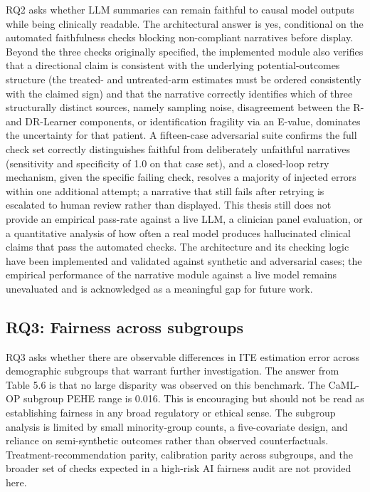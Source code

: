 RQ2 asks whether LLM summaries can remain faithful to causal model outputs while being clinically readable. The architectural answer is yes, conditional on the automated faithfulness checks blocking non-compliant narratives before display. Beyond the three checks originally specified, the implemented module also verifies that a directional claim is consistent with the underlying potential-outcomes structure (the treated- and untreated-arm estimates must be ordered consistently with the claimed sign) and that the narrative correctly identifies which of three structurally distinct sources, namely sampling noise, disagreement between the R- and DR-Learner components, or identification fragility via an E-value, dominates the uncertainty for that patient. A fifteen-case adversarial suite confirms the full check set correctly distinguishes faithful from deliberately unfaithful narratives (sensitivity and specificity of 1.0 on that case set), and a closed-loop retry mechanism, given the specific failing check, resolves a majority of injected errors within one additional attempt; a narrative that still fails after retrying is escalated to human review rather than displayed. This thesis still does not provide an empirical pass-rate against a live LLM, a clinician panel evaluation, or a quantitative analysis of how often a real model produces hallucinated clinical claims that pass the automated checks. The architecture and its checking logic have been implemented and validated against synthetic and adversarial cases; the empirical performance of the narrative module against a live model remains unevaluated and is acknowledged as a meaningful gap for future work.

\subsection{RQ3: Fairness across subgroups}\label{rq3, fairness-across-subgroups}

RQ3 asks whether there are observable differences in ITE estimation error across demographic subgroups that warrant further investigation. The answer from Table 5.6 is that no large disparity was observed on this benchmark. The CaML-OP subgroup PEHE range is 0.016. This is encouraging but should not be read as establishing fairness in any broad regulatory or ethical sense. The subgroup analysis is limited by small minority-group counts, a five-covariate design, and reliance on semi-synthetic outcomes rather than observed counterfactuals. Treatment-recommendation parity, calibration parity across subgroups, and the broader set of checks expected in a high-risk AI fairness audit are not provided here.

